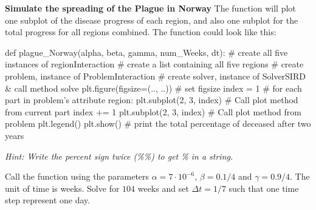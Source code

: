 \begin{Problem}{\textbf{Simulate the spreading of the Plague in Norway}}
The function will plot one subplot of the disease progress of each region, and also one subplot for the total progress for all regions combined.
The function could look like this:
\begin{python}
def plague_Norway(alpha, beta, gamma, num_Weeks, dt):
    # create all five instances of regionInteraction
    # create a list containing all five regions
    # create problem, instance of ProblemInteraction
    # create solver, instance of SolverSIRD & call method solve 
    plt.figure(figsize=(.., ..)) # set figsize 
    index = 1
    # for each part in problem's attribute region:
        plt.subplot(2, 3, index) 
        # Call plot method from current part
        index += 1
    plt.subplot(2, 3, index)
    # Call plot method from problem
    plt.legend()
    plt.show()
    # print the total percentage of deceased after two years 
\end{python}
 \textit{Hint: Write the percent sign twice (\%\%) to get \% in a string.}

Call the function using the parameters $\alpha= 7 \cdot 10^{-6}$, $\beta=0.1/4$ and $\gamma=0.9/4$. The unit of time is weeks. Solve for $104$ weeks and set $\Delta t = 1/7$ such that one time step represent one day.


\end{Problem}
